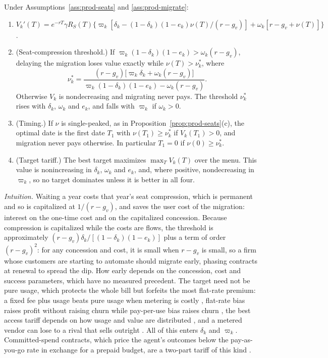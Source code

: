 \begin{proposition}\label{prop:prod-migrate}
Under Assumptions~\ref{ass:prod-seats} and \ref{ass:prod-migrate}:
\begin{enumerate}
\item[(a)] $V_k'(T)=e^{-rT}\gamma R_S(T)\bigl\{\varpi_k[\delta_k-(1-\delta_k)(1-e_k)\nu(T)/(r-g_v)]+\omega_k[r-g_v+\nu(T)]\bigr\}$.
\item[(b)] (Seat-compression threshold.) If $\varpi_k(1-\delta_k)(1-e_k)>\omega_k(r-g_v)$, delaying the migration loses value exactly while $\nu(T)>\nu^*_k$, where
\begin{equation}\label{eq:prod-nustar}
\nu^*_k=\frac{(r-g_v)\bigl[\varpi_k\delta_k+\omega_k(r-g_v)\bigr]}{\varpi_k(1-\delta_k)(1-e_k)-\omega_k(r-g_v)} .
\end{equation}
Otherwise $V_k$ is nondecreasing and migrating never pays. The threshold $\nu^*_k$ rises with $\delta_k$, $\omega_k$ and $e_k$, and falls with $\varpi_k$ if $\omega_k>0$.
\item[(c)] (Timing.) If $\nu$ is single-peaked, as in Proposition~\ref{prop:prod-seats}(c), the optimal date is the first date $T_1$ with $\nu(T_1)\ge\nu^*_k$ if $V_k(T_1)>0$, and migration never pays otherwise. In particular $T_1=0$ if $\nu(0)\ge\nu^*_k$.
\item[(d)] (Target tariff.) The best target maximizes $\max_TV_k(T)$ over the menu. This value is nonincreasing in $\delta_k$, $\omega_k$ and $e_k$, and, where positive, nondecreasing in $\varpi_k$, so no target dominates unless it is better in all four.
\end{enumerate}
\end{proposition}

\noindent\emph{Intuition.} Waiting a year costs that year's seat compression, which is permanent and so is capitalized at $1/(r-g_v)$, and saves the user cost of the migration: interest on the one-time cost and on the capitalized concession. Because compression is capitalized while the costs are flows, the threshold is approximately $(r-g_v)\delta_k/[(1-\delta_k)(1-e_k)]$ plus a term of order $(r-g_v)^2$: for any concession and cost, it is small when $r-g_v$ is small, so a firm whose customers are starting to automate should migrate early, phasing contracts at renewal to spread the dip. How early depends on the concession, cost and success parameters, which have no measured precedent. The target need not be pure usage, which protects the whole bill but forfeits the most flat-rate premium: a fixed fee plus usage beats pure usage when metering is costly \citep{sundararajan2004nonlinear}, flat-rate bias raises profit without raising churn while pay-per-use bias raises churn \citep{lambrecht2006paying}, the best access tariff depends on how usage and value are distributed \citep{essegaier2002pricing}, and a metered vendor can lose to a rival that sells outright \citep{balasubramanian2015pricing}. All of this enters $\delta_k$ and $\varpi_k$. Committed-spend contracts, which price the agent's outcomes below the pay-as-you-go rate in exchange for a prepaid budget, are a two-part tariff of this kind \citep{bergemann2025menu}.

